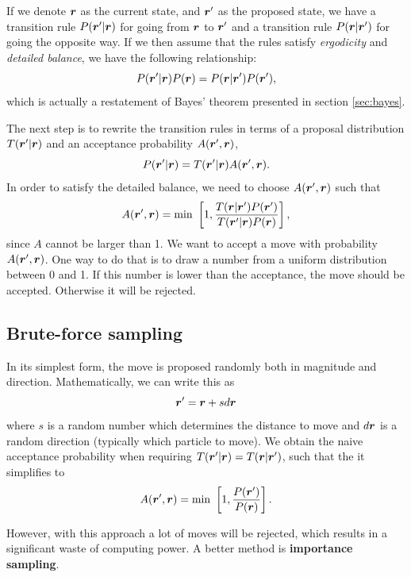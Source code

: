 If we denote $\boldsymbol{{r}}$ as the current state, and $\boldsymbol{{r}}'$ as the proposed state, we have a transition rule $P(\boldsymbol{{r}}'|\boldsymbol{{r}})$ for going from $\boldsymbol{{r}}$ to $\boldsymbol{{r}}'$ and a transition rule $P(\boldsymbol{{r}}|\boldsymbol{{r}}')$ for going the opposite way. If we then assume that the rules satisfy \textit{ergodicity} and \textit{detailed balance}, we have the following relationship:
\begin{equation}
P(\boldsymbol{{r}}'|\boldsymbol{{r}})P(\boldsymbol{{r}})=P(\boldsymbol{{r}}|\boldsymbol{{r}}')P(\boldsymbol{{r}}'),
\end{equation}
which is actually a restatement of Bayes' theorem presented in section \ref{sec:bayes}.

The next step is to rewrite the transition rules in terms of a proposal distribution $T(\boldsymbol{{r}}'|\boldsymbol{{r}})$ and an acceptance probability $A(\boldsymbol{{r}}',\boldsymbol{{r}})$,
\begin{equation}
P(\boldsymbol{{r}}'|\boldsymbol{{r}})=T(\boldsymbol{{r}}'|\boldsymbol{{r}})A(\boldsymbol{{r}}',\boldsymbol{{r}}).
\end{equation}
In order to satisfy the detailed balance, we need to choose $A(\boldsymbol{{r}}',\boldsymbol{{r}})$ such that
\begin{equation}
A(\boldsymbol{{r}}',\boldsymbol{{r}})=\text{min }\left[1,\frac{T(\boldsymbol{{r}}|\boldsymbol{{r}}')P(\boldsymbol{{r}}')}{T(\boldsymbol{{r}}'|\boldsymbol{{r}})P(\boldsymbol{{r}})}\right],
\label{eq:acceptance}
\end{equation}
since $A$ cannot be larger than 1. We want to accept a move with probability $A(\boldsymbol{{r}}',\boldsymbol{{r}})$. One way to do that is to draw a number from a uniform distribution between 0 and 1. If this number is lower than the acceptance, the move should be accepted. Otherwise it will be rejected.

\subsection{Brute-force sampling}
In its simplest form, the move is proposed randomly both in magnitude and direction. Mathematically, we can write this as
\begin{equation}
\boldsymbol{{r}}'=\boldsymbol{{r}}+sd\boldsymbol{{r}}
\end{equation}
where $s$ is a random number which determines the distance to move and $d\boldsymbol{{r}}$ is a random direction (typically which particle to move). We obtain the naive acceptance probability when requiring $T(\boldsymbol{{r}}'|\boldsymbol{{r}})=T(\boldsymbol{{r}}|\boldsymbol{{r}}')$, such that the it simplifies to
\begin{equation}
A(\boldsymbol{{r}}',\boldsymbol{{r}})=\text{min }\left[1,\frac{P(\boldsymbol{{r}}')}{P(\boldsymbol{{r}})}\right].
\end{equation}

However, with this approach a lot of moves will be rejected, which results in a significant waste of computing power. A better method is \textbf{importance sampling}.

